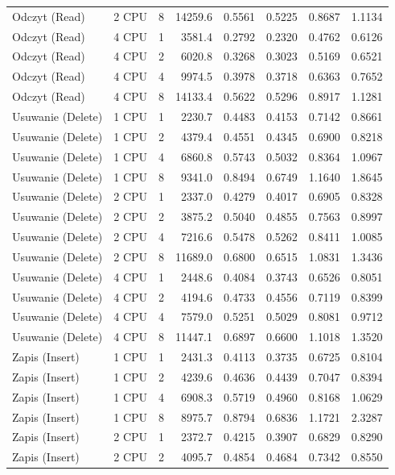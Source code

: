 \begin{table}[ht]
{\begin{tabular}{llcrrrrr}
Odczyt (Read) & 2 CPU & 8 & 14259.6 & 0.5561 & 0.5225 & 0.8687 & 1.1134 \\
Odczyt (Read) & 4 CPU & 1 & 3581.4 & 0.2792 & 0.2320 & 0.4762 & 0.6126 \\
Odczyt (Read) & 4 CPU & 2 & 6020.8 & 0.3268 & 0.3023 & 0.5169 & 0.6521 \\
Odczyt (Read) & 4 CPU & 4 & 9974.5 & 0.3978 & 0.3718 & 0.6363 & 0.7652 \\
Odczyt (Read) & 4 CPU & 8 & 14133.4 & 0.5622 & 0.5296 & 0.8917 & 1.1281 \\
Usuwanie (Delete) & 1 CPU & 1 & 2230.7 & 0.4483 & 0.4153 & 0.7142 & 0.8661 \\
Usuwanie (Delete) & 1 CPU & 2 & 4379.4 & 0.4551 & 0.4345 & 0.6900 & 0.8218 \\
Usuwanie (Delete) & 1 CPU & 4 & 6860.8 & 0.5743 & 0.5032 & 0.8364 & 1.0967 \\
Usuwanie (Delete) & 1 CPU & 8 & 9341.0 & 0.8494 & 0.6749 & 1.1640 & 1.8645 \\
Usuwanie (Delete) & 2 CPU & 1 & 2337.0 & 0.4279 & 0.4017 & 0.6905 & 0.8328 \\
Usuwanie (Delete) & 2 CPU & 2 & 3875.2 & 0.5040 & 0.4855 & 0.7563 & 0.8997 \\
Usuwanie (Delete) & 2 CPU & 4 & 7216.6 & 0.5478 & 0.5262 & 0.8411 & 1.0085 \\
Usuwanie (Delete) & 2 CPU & 8 & 11689.0 & 0.6800 & 0.6515 & 1.0831 & 1.3436 \\
Usuwanie (Delete) & 4 CPU & 1 & 2448.6 & 0.4084 & 0.3743 & 0.6526 & 0.8051 \\
Usuwanie (Delete) & 4 CPU & 2 & 4194.6 & 0.4733 & 0.4556 & 0.7119 & 0.8399 \\
Usuwanie (Delete) & 4 CPU & 4 & 7579.0 & 0.5251 & 0.5029 & 0.8081 & 0.9712 \\
Usuwanie (Delete) & 4 CPU & 8 & 11447.1 & 0.6897 & 0.6600 & 1.1018 & 1.3520 \\
Zapis (Insert) & 1 CPU & 1 & 2431.3 & 0.4113 & 0.3735 & 0.6725 & 0.8104 \\
Zapis (Insert) & 1 CPU & 2 & 4239.6 & 0.4636 & 0.4439 & 0.7047 & 0.8394 \\
Zapis (Insert) & 1 CPU & 4 & 6908.3 & 0.5719 & 0.4960 & 0.8168 & 1.0629 \\
Zapis (Insert) & 1 CPU & 8 & 8975.7 & 0.8794 & 0.6836 & 1.1721 & 2.3287 \\
Zapis (Insert) & 2 CPU & 1 & 2372.7 & 0.4215 & 0.3907 & 0.6829 & 0.8290 \\
Zapis (Insert) & 2 CPU & 2 & 4095.7 & 0.4854 & 0.4684 & 0.7342 & 0.8550 \\

\end{tabular}}
\end{table}
